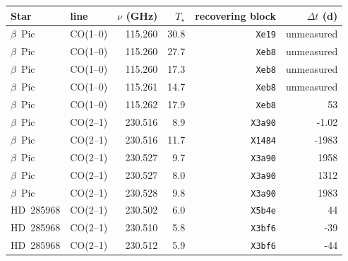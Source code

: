 \begin{tabular}{@{}llrrrr@{}}
\hline
Star & line & $\nu$ (GHz) & $T_\star$ & recovering block & $\Delta t$ (d) \\
\hline
$\beta$~Pic & CO(1--0) & 115.260 & 30.8 & \texttt{Xe19} & unmeasured \\
$\beta$~Pic & CO(1--0) & 115.260 & 27.7 & \texttt{Xeb8} & unmeasured \\
$\beta$~Pic & CO(1--0) & 115.260 & 17.3 & \texttt{Xeb8} & unmeasured \\
$\beta$~Pic & CO(1--0) & 115.261 & 14.7 & \texttt{Xeb8} & unmeasured \\
$\beta$~Pic & CO(1--0) & 115.262 & 17.9 & \texttt{Xeb8} & 53 \\
$\beta$~Pic & CO(2--1) & 230.516 & 8.9 & \texttt{X3a90} & -1.02 \\
$\beta$~Pic & CO(2--1) & 230.516 & 11.7 & \texttt{X1484} & -1983 \\
$\beta$~Pic & CO(2--1) & 230.527 & 9.7 & \texttt{X3a90} & 1958 \\
$\beta$~Pic & CO(2--1) & 230.527 & 8.0 & \texttt{X3a90} & 1312 \\
$\beta$~Pic & CO(2--1) & 230.528 & 9.8 & \texttt{X3a90} & 1983 \\
HD~285968 & CO(2--1) & 230.502 & 6.0 & \texttt{X5b4e} & 44 \\
HD~285968 & CO(2--1) & 230.510 & 5.8 & \texttt{X3bf6} & -39 \\
HD~285968 & CO(2--1) & 230.512 & 5.9 & \texttt{X3bf6} & -44 \\
\hline
\end{tabular}
